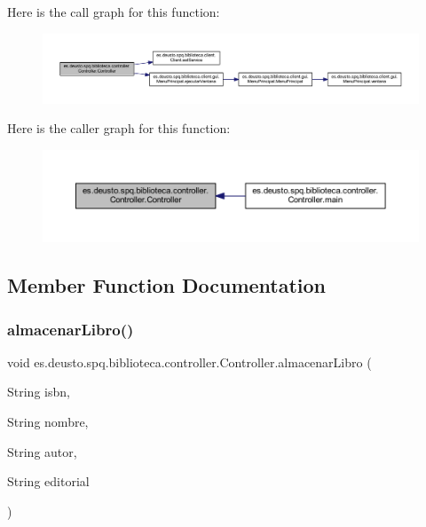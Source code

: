 Here is the call graph for this function\+:
\nopagebreak
\begin{figure}[H]
\begin{center}
\leavevmode
\includegraphics[width=350pt]{classes_1_1deusto_1_1spq_1_1biblioteca_1_1controller_1_1_controller_a130eebcaf76a2f9ed7d3d032ab232746_cgraph}
\end{center}
\end{figure}
Here is the caller graph for this function\+:
\nopagebreak
\begin{figure}[H]
\begin{center}
\leavevmode
\includegraphics[width=350pt]{classes_1_1deusto_1_1spq_1_1biblioteca_1_1controller_1_1_controller_a130eebcaf76a2f9ed7d3d032ab232746_icgraph}
\end{center}
\end{figure}


\subsection{Member Function Documentation}
\mbox{\label{classes_1_1deusto_1_1spq_1_1biblioteca_1_1controller_1_1_controller_a2e23b6eb05badf918991f4103918be6e}} 
\subsubsection{\texorpdfstring{almacenar\+Libro()}{almacenarLibro()}}
{\footnotesize\ttfamily void es.\+deusto.\+spq.\+biblioteca.\+controller.\+Controller.\+almacenar\+Libro (\begin{DoxyParamCaption}\item[{String}]{isbn,  }\item[{String}]{nombre,  }\item[{String}]{autor,  }\item[{String}]{editorial }\end{DoxyParamCaption})}

